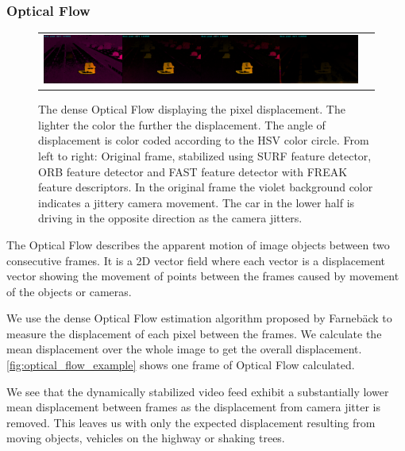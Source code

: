 \subsubsection{Optical Flow}
\begin{figure}[!ht]
    \centering
    \begin{tabular}{cc}
      \includegraphics[width=0.95\linewidth]{images/frame_1317_cropped.png}    &  
    \end{tabular}
    \caption{
        The dense Optical Flow displaying the pixel displacement.
        The lighter the color the further the displacement. 
        The angle of displacement is color coded according to the HSV color circle.  
        From left to right: Original frame, 
        stabilized using SURF \cite{bay10.1007/11744023_32,opencv_library} feature detector,
        ORB \cite{rublee6126544, opencv_library} feature detector and
        FAST \cite{Ghahremani_2021,opencv_library} feature detector with FREAK \cite{alahi6247715,opencv_library} feature descriptors.
        In the original frame the violet background color indicates a jittery camera movement. 
        The car in the lower half is driving in the opposite direction as the camera jitters. 
    }
    \label{fig:optical_flow_example}
\end{figure}

The Optical Flow describes the apparent motion of image objects between two consecutive frames. 
It is a 2D vector field where each vector is a displacement vector showing the movement of points between the frames caused by movement of the objects or cameras.

We use the dense Optical Flow estimation algorithm proposed by Farnebäck \cite{farnback10.1007/3-540-45103-X_50,opencv_library} to measure the displacement of each pixel between the frames. 
We calculate the mean displacement over the whole image to get the overall displacement. 
\autoref{fig:optical_flow_example} shows one frame of Optical Flow calculated.

We see that the dynamically stabilized video feed exhibit a substantially lower mean displacement between frames as the displacement from camera jitter is removed.
This leaves us with only the expected displacement resulting from moving objects, \eg{} vehicles on the highway or shaking trees.

